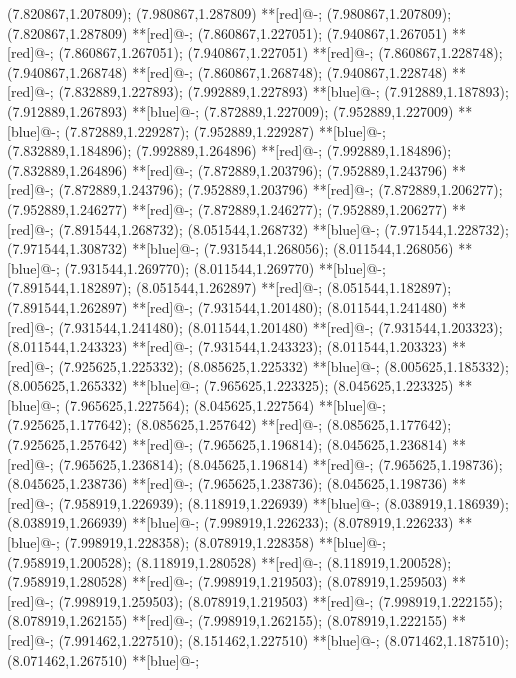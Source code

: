 (7.820867,1.207809); (7.980867,1.287809) **[red]@{-};
(7.980867,1.207809); (7.820867,1.287809) **[red]@{-};
(7.860867,1.227051); (7.940867,1.267051) **[red]@{-};
(7.860867,1.267051); (7.940867,1.227051) **[red]@{-};
(7.860867,1.228748); (7.940867,1.268748) **[red]@{-};
(7.860867,1.268748); (7.940867,1.228748) **[red]@{-};
(7.832889,1.227893); (7.992889,1.227893) **[blue]@{-};
(7.912889,1.187893); (7.912889,1.267893) **[blue]@{-};
(7.872889,1.227009); (7.952889,1.227009) **[blue]@{-};
(7.872889,1.229287); (7.952889,1.229287) **[blue]@{-};
(7.832889,1.184896); (7.992889,1.264896) **[red]@{-};
(7.992889,1.184896); (7.832889,1.264896) **[red]@{-};
(7.872889,1.203796); (7.952889,1.243796) **[red]@{-};
(7.872889,1.243796); (7.952889,1.203796) **[red]@{-};
(7.872889,1.206277); (7.952889,1.246277) **[red]@{-};
(7.872889,1.246277); (7.952889,1.206277) **[red]@{-};
(7.891544,1.268732); (8.051544,1.268732) **[blue]@{-};
(7.971544,1.228732); (7.971544,1.308732) **[blue]@{-};
(7.931544,1.268056); (8.011544,1.268056) **[blue]@{-};
(7.931544,1.269770); (8.011544,1.269770) **[blue]@{-};
(7.891544,1.182897); (8.051544,1.262897) **[red]@{-};
(8.051544,1.182897); (7.891544,1.262897) **[red]@{-};
(7.931544,1.201480); (8.011544,1.241480) **[red]@{-};
(7.931544,1.241480); (8.011544,1.201480) **[red]@{-};
(7.931544,1.203323); (8.011544,1.243323) **[red]@{-};
(7.931544,1.243323); (8.011544,1.203323) **[red]@{-};
(7.925625,1.225332); (8.085625,1.225332) **[blue]@{-};
(8.005625,1.185332); (8.005625,1.265332) **[blue]@{-};
(7.965625,1.223325); (8.045625,1.223325) **[blue]@{-};
(7.965625,1.227564); (8.045625,1.227564) **[blue]@{-};
(7.925625,1.177642); (8.085625,1.257642) **[red]@{-};
(8.085625,1.177642); (7.925625,1.257642) **[red]@{-};
(7.965625,1.196814); (8.045625,1.236814) **[red]@{-};
(7.965625,1.236814); (8.045625,1.196814) **[red]@{-};
(7.965625,1.198736); (8.045625,1.238736) **[red]@{-};
(7.965625,1.238736); (8.045625,1.198736) **[red]@{-};
(7.958919,1.226939); (8.118919,1.226939) **[blue]@{-};
(8.038919,1.186939); (8.038919,1.266939) **[blue]@{-};
(7.998919,1.226233); (8.078919,1.226233) **[blue]@{-};
(7.998919,1.228358); (8.078919,1.228358) **[blue]@{-};
(7.958919,1.200528); (8.118919,1.280528) **[red]@{-};
(8.118919,1.200528); (7.958919,1.280528) **[red]@{-};
(7.998919,1.219503); (8.078919,1.259503) **[red]@{-};
(7.998919,1.259503); (8.078919,1.219503) **[red]@{-};
(7.998919,1.222155); (8.078919,1.262155) **[red]@{-};
(7.998919,1.262155); (8.078919,1.222155) **[red]@{-};
(7.991462,1.227510); (8.151462,1.227510) **[blue]@{-};
(8.071462,1.187510); (8.071462,1.267510) **[blue]@{-};
